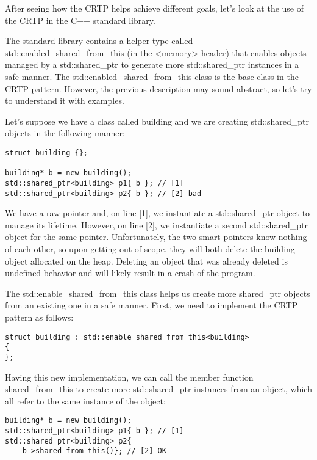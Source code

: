 After seeing how the CRTP helps achieve different goals, let’s look at the use of the CRTP in the C++ standard library.


The standard library contains a helper type called std::enabled\_shared\_from\_this (in the <memory> header) that enables objects managed by a std::shared\_ptr to generate more std::shared\_ptr instances in a safe manner. The std::enabled\_shared\_from\_this class is the base class in the CRTP pattern. However, the previous description may sound abstract, so let’s try to understand it with examples.

Let’s suppose we have a class called building and we are creating std::shared\_ptr objects in the following manner:

\begin{lstlisting}[style=styleCXX]
struct building {};

building* b = new building();
std::shared_ptr<building> p1{ b }; // [1]
std::shared_ptr<building> p2{ b }; // [2] bad
\end{lstlisting}

We have a raw pointer and, on line [1], we instantiate a std::shared\_ptr object to manage its lifetime. However, on line [2], we instantiate a second std::shared\_ptr object for the same pointer. Unfortunately, the two smart pointers know nothing of each other, so upon getting out of scope, they will both delete the building object allocated on the heap. Deleting an object that was already deleted is undefined behavior and will likely result in a crash of the program.

The std::enable\_shared\_from\_this class helps us create more shared\_ptr objects from an existing one in a safe manner. First, we need to implement the CRTP pattern as follows:

\begin{lstlisting}[style=styleCXX]
struct building : std::enable_shared_from_this<building>
{
};
\end{lstlisting}

Having this new implementation, we can call the member function shared\_from\_this to create more std::shared\_ptr instances from an object, which all refer to the same instance of the object:

\begin{lstlisting}[style=styleCXX]
building* b = new building();
std::shared_ptr<building> p1{ b }; // [1]
std::shared_ptr<building> p2{
	b->shared_from_this()}; // [2] OK
\end{lstlisting}

